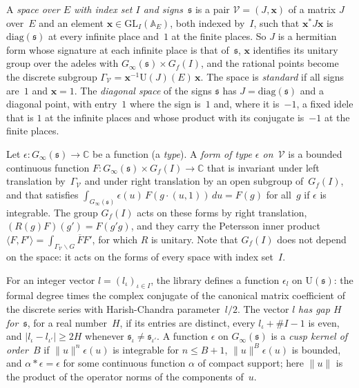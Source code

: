 \documentclass[11pt,a4paper]{article}
\newcommand{\m}[1]{\mbox{$#1$}}        %
\theoremstyle{plainx}
\theoremstyle{uprightx}
\newcommand{\cV}{{\mathcal V}}
\newcommand{\fs}{{\mathfrak s}}
\newcommand{\GL}{\mathrm{GL}}
\begin{document}
A \emph{space over $E$ with index set $I$ and signs~$\fs$} is a pair \m{\cV=(J,\mathbf x)} of a matrix $J$
over~$E$ and an element \m{\mathbf x\in\GL_I(\mathbb A_E)}, both indexed by~$I$, such that
\m{\mathbf x^*J\mathbf x} is \m{\mathrm{diag}(\fs)} at every infinite place and~$1$ at the finite places. So $J$
is a hermitian form whose signature at each infinite place is that of~$\fs$, $\mathbf x$ identifies its unitary
group over the adeles with \m{G_\infty(\fs)\times G_f(I)}, and the rational points become the discrete subgroup
\m{\Gamma_\cV=\mathbf x^{-1}\mathrm U(J)(E)\,\mathbf x}. The space is \emph{standard} if all signs are~$1$ and
\m{\mathbf x=1}. The \emph{diagonal space} of the signs $\fs$ has \m{J=\mathrm{diag}(\fs)} and a diagonal
point, with entry~$1$ where the sign is~$1$ and, where it is~$-1$, a fixed idele that is $1$ at the infinite
places and whose product with its conjugate is~$-1$ at the finite places.

Let \m{\epsilon\colon G_\infty(\fs)\to\mathbb C} be a function (a \emph{type}). A \emph{form of type $\epsilon$
on~$\cV$} is a bounded continuous function \m{F\colon G_\infty(\fs)\times G_f(I)\to\mathbb C} that is invariant
under left translation by~$\Gamma_\cV$ and under right translation by an open subgroup of~$G_f(I)$, and that
satisfies \m{\int_{G_\infty(\fs)}\epsilon(u)\,F(g\cdot(u,1))\,du=F(g)} for all~$g$ if $\epsilon$ is integrable. The
group $G_f(I)$ acts on these forms by right translation, \m{(R(g)F)(g')=F(g'g)}, and they carry the Petersson
inner product \m{\langle F,F'\rangle=\int_{\Gamma_\cV\backslash G}\overline{F}F'}, for which $R$ is unitary. Note
that $G_f(I)$ does not depend on the space: it acts on the forms of every space with index set~$I$.

For an integer vector \m{l=(l_\iota)_{\iota\in I}}, the library defines a function $\epsilon_l$ on
\m{\mathrm U(\fs)}: the formal degree times the complex conjugate of the canonical matrix coefficient of the
discrete series with Harish-Chandra parameter~$l/2$. The vector $l$ \emph{has gap $H$ for~$\fs$}, for a real
number~$H$, if its entries are distinct, every \m{l_\iota+\#I-1} is even, and \m{|l_\iota-l_{\iota'}|\ge2H}
whenever \m{\fs_\iota\ne\fs_{\iota'}}. A function $\epsilon$ on \m{G_\infty(\fs)} is a \emph{cusp kernel of
order~$B$} if \m{\|u\|^{n}\epsilon(u)} is integrable for \m{n\le B+1}, \m{\|u\|^{B}\epsilon(u)} is bounded, and
\m{\alpha*\epsilon=\epsilon} for some continuous function $\alpha$ of compact support; here \m{\|u\|} is the
product of the operator norms of the components of~$u$.
\end{document}
